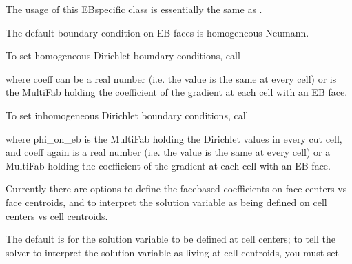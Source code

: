 \documentclass[letterpaper,10pt,english]{sphinxmanual}
\begin{document}
\sphinxAtStartPar
The usage of this EB\sphinxhyphen{}specific class is essentially the same as
.

\sphinxAtStartPar
The default boundary condition on EB faces is homogeneous Neumann.

\sphinxAtStartPar
To set homogeneous Dirichlet boundary conditions, call

\begin{sphinxVerbatim}[commandchars=\\\{\}]
 
\end{sphinxVerbatim}

\sphinxAtStartPar
where coeff can be a real number (i.e. the value is the same at every cell)
or is the MultiFab holding the coefficient of the gradient at each cell with an EB face.

\sphinxAtStartPar
To set inhomogeneous Dirichlet boundary conditions, call

\begin{sphinxVerbatim}[commandchars=\\\{\}]
  
\end{sphinxVerbatim}

\sphinxAtStartPar
where phi\_on\_eb is the MultiFab holding the Dirichlet values in every cut cell,
and coeff again is a real number (i.e. the value is the same at every cell)
or a MultiFab holding the coefficient of the gradient at each cell with an EB face.

\sphinxAtStartPar
Currently there are options to define the face\sphinxhyphen{}based coefficients on
face centers vs face centroids, and to interpret the solution variable
as being defined on cell centers vs cell centroids.

\sphinxAtStartPar
The default is for the solution variable to be defined at cell centers;
to tell the solver to interpret the solution variable as living
at cell centroids, you must set

\begin{sphinxVerbatim}[commandchars=\\\{\}]
\end{sphinxVerbatim}
\end{document}
